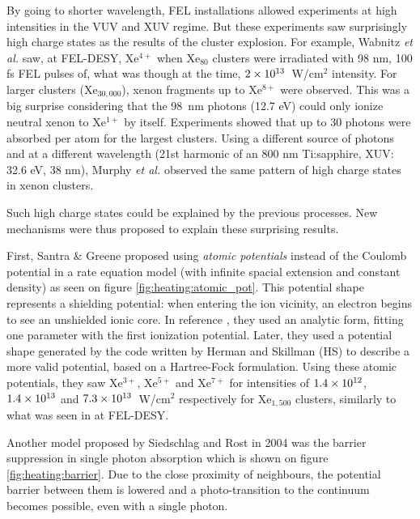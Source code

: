 By going to shorter wavelength, FEL installations allowed experiments at high
intensities in the VUV and XUV regime. But these experiments saw surprisingly
high charge states as the results of the cluster
explosion\cite{Wabnitz2002,Bostedt2010}. For example, Wabnitz \textit{et al.}
saw, at FEL-DESY, Xe$^{4+}$ when Xe$_{80}$ clusters were irradiated with 98 nm,
100 fs FEL pulses of, what was though at the time, $\ten{2}{13}$~W/cm$^2$
intensity. For larger clusters (Xe$_{30,000}$), xenon fragments up to
Xe$^{8+}$ were observed. This was a big surprise considering that the 98~nm
photons (12.7 eV) could only ionize neutral xenon to Xe$^{1+}$ by itself.
Experiments showed that up to 30 photons were absorbed per atom for the largest
clusters. Using a different source of photons and at a different wavelength
(21st harmonic of an 800 nm Ti:sapphire, XUV: 32.6 eV, 38 nm),
Murphy \textit{et al.} observed the same pattern of high charge states in xenon
clusters\cite{Murphy2008a,Murphy2008b}.

Such high charge states could be explained by the previous processes. New
mechanisms were thus proposed to explain these surprising results.


First, Santra \& Greene proposed using \textit{atomic potentials} instead of
the Coulomb potential in a rate equation model (with infinite spacial
extension and
constant density) as seen on figure \ref{fig:heating:atomic_pot}.
This potential shape represents a shielding potential: when
entering the ion vicinity, an electron begins to see an unshielded ionic core.
In reference \cite{Greene2003}, they used an analytic form, fitting one
parameter
with the first ionization potential. Later\cite{Walters2006}, they used a
potential shape generated by the code written by Herman and
Skillman\cite{HS1963} (HS) to describe a more valid potential, based on a
Hartree-Fock formulation. Using these atomic potentials, they saw Xe$^{3+}$,
Xe$^{5+}$ and Xe$^{7+}$ for intensities of $\ten{1.4}{12}$, $\ten{1.4}{13}$ and
$\ten{7.3}{13}$~W/cm$^2$ respectively for Xe$_{1,500}$ clusters, similarly to
what was seen in at FEL-DESY.

Another model proposed by Siedschlag and Rost\cite{Siedschlag2004} in 2004 was
the barrier suppression in single photon absorption which is shown on figure
\ref{fig:heating:barrier}. Due to the close proximity
of neighbours, the potential barrier between them is lowered and
a photo-transition to the continuum becomes possible, even with a single photon.

